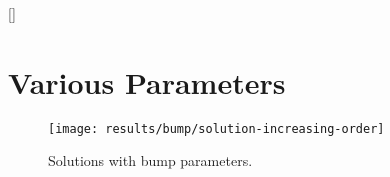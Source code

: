 \appendix
{}[\vspace{4.5cm}]
\titlespacing{\chapter}{0cm}{0cm}{0cm}

\chapter{Various Parameters}
\label{chap:appendix}

\begin{figure}[H]
  \centering
  \label{fig:bump-solutions}
  \texttt{[image: results/bump/solution-increasing-order]}
  \caption[Bump parameter solutions]{Solutions with bump parameters.}
\end{figure}

